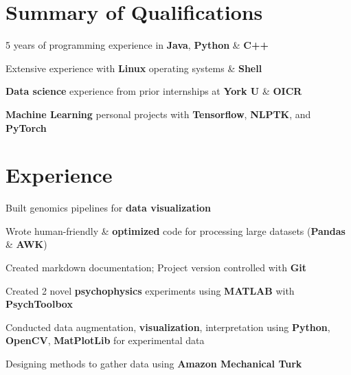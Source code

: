 \documentclass[]{chandan-cv}
\begin{document}
\begin{minipage}[t]{0.73\textwidth}


\section{Summary of Qualifications}
\runsubsection{ }
\descript{ }
\location{ }
\vspace{\topsep} %
\begin{tightemize}
	\item 5 years of programming experience in \textbf{Java}, \textbf{Python} \& \textbf{C++}
	\item Extensive experience with \textbf{Linux} operating systems \& \textbf{Shell}
	\item \textbf{Data science} experience from prior internships at \textbf{York U} \& \textbf{OICR}
	\item \textbf{Machine Learning} personal projects with \textbf{Tensorflow}, \textbf{NLPTK}, and \textbf{PyTorch}
\end{tightemize}
\sectionsep


\section{Experience}
\begin{tightemize}
	\item Built genomics pipelines for \textbf{data visualization}
	\item Wrote human-friendly & \textbf{optimized} code for processing large datasets (\textbf{Pandas} \& \textbf{AWK})
	\item Created markdown documentation; Project version controlled with \textbf{Git}
\end{tightemize}
\sectionsep

\begin{tightemize}
	\item Created 2 novel \textbf{psychophysics} experiments using \textbf{MATLAB} with \textbf{PsychToolbox}
	\item Conducted data augmentation, \textbf{visualization}, interpretation using \textbf{Python}, \textbf{OpenCV}, \textbf{MatPlotLib} for experimental data
	\item Designing methods to gather data using \textbf{Amazon Mechanical Turk}
\end{tightemize}
\sectionsep


\end{minipage}
\end{document}
